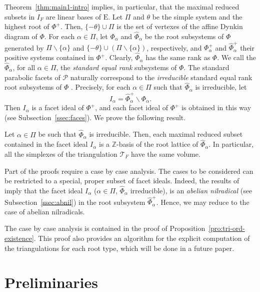\documentclass[ALCO,published]{cedram}
\newcommand\pol{\mathcal P}
\theoremstyle{plain}
\newcommand\wh{\widehat}
\newcommand\mc{\mathcal}
\newcommand\smeno{\smallsetminus}
\newcommand\ganz{\mathbb Z}
\newcommand\pol{\mathcal P}
\newcommand\al{\alpha}
\begin{document}
\par
Theorem~\ref{thm:main1-intro} implies, in particular, that the maximal reduced subsets in $I_F$ are linear bases of $\mathrm E$. 
Let $\Pi$ and $\theta$ be the simple system and the highest root of $\Phi^+$. 
Then, $\{-\theta\}\cup \Pi$ is the set of vertexes of the affine Dynkin diagram of $\Phi$.
For each $\al\in \Pi$,  let $\Phi_{\al}$ and $\wh\Phi_{\al}$ be the root subsystems of $\Phi$ generated by $\Pi\smeno\{\al\}$ and  $\{-\theta\}\cup (\Pi\smeno\{\al\})$, respectively, and $\Phi_\al^+$ and $\wh\Phi_{\al}^+$ their positive systems contained in $\Phi^+$.
Clearly, $\wh\Phi_{\al}$ has the same rank as $\Phi$.
We call the $\wh\Phi_\al$, for all $\al\in \Pi$, the {\it standard equal rank} subsystems of $\Phi$.
The standard parabolic facets of $\pol$ naturally correspond to the {\it irreducible} standard equal rank root  subsystems of $\Phi$ \cite{CM1}. 
Precisely, for each $\al\in \Pi$ such that $\wh\Phi_{\al}$ is irreducible,  let
$$
I_\al=\wh\Phi_{\al}^+\smeno \Phi_\al.
$$ 
Then $I_\al$ is a facet ideal of $\Phi^+$, and each facet ideal of $\Phi^+$ is obtained in this way (see Subsection~\ref{ssec:faces}). We prove the following result.


\begin{thm}\label{thm:main2-intro}
Let $\al\in \Pi$ be such that $\wh\Phi_{\al}$ is irreducible.
Then, each  maximal reduced subset contained in the facet ideal $I_\al$ is a $\ganz$-basis of the root lattice of $\wh\Phi_{\al}$.  
In particular, all the simplexes of the triangulation  $\mc T_F$  have the same volume.
\end{thm}


\par
Part of the proofs require a case by case analysis. 
The cases to be considered can be restricted to a special, proper subset of facet ideals. 
Indeed, the results of \cite{CM1} imply that the facet ideal  $I_\al$  ($\al\in \Pi$,  $\wh\Phi_{\al}$ irreducible), is an {\it abelian nilradical} (see Subsection~\ref{ssec:abnil}) in the root subsystem $\wh\Phi_\al^+$.  
Hence, we may reduce to the case of abelian nilradicals.

\par
The case by case analysis is contained in the proof of Proposition~\ref{pro:tri-ord-existence}.
This proof also provides an algorithm for the explicit computation of the triangulations for each root type, which will be done in a future paper. 

\section{Preliminaries}\label{sec:preli}
\end{document}
